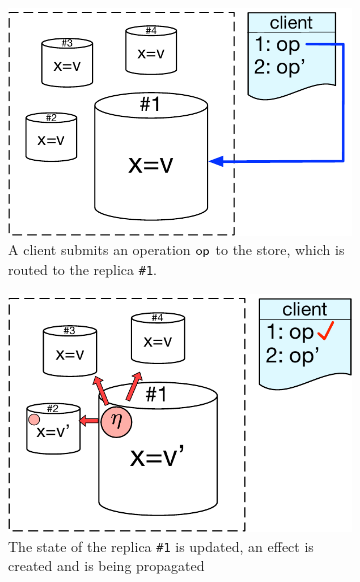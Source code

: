 \begin{figure}[t]
    \centering
    \begin{subfigure}[t]{0.3\textwidth}
    \centering
        \includegraphics[scale=0.32]{Figures/system_model1.pdf}
        \caption{\scriptsize A client submits an operation ${\normalfont \textsf{op}}$ to the store, which
	is routed to the replica \texttt{\#1}.}
        \label{fig:sys_model1}
    \end{subfigure}
    \hfill
    \vline
    \hfill
    \begin{subfigure}[t]{0.3\textwidth}
        \centering
	\includegraphics[scale=0.32]{Figures/system_model2.pdf}
        \caption{\scriptsize The state of the replica \texttt{\#1} is updated, an
	effect is created and is being propagated}
        \label{fig:sys_model2}
    \end{subfigure}
    \hfill
    \vline
    \hfill
    \begin{subfigure}[t]{0.3\textwidth}

\end{subfigure}
\end{figure}
